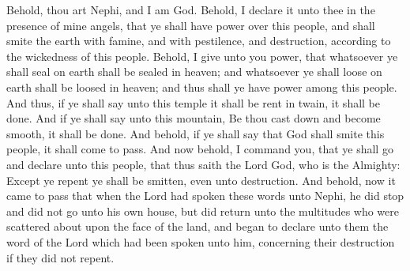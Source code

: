 \bverse \iffalse Behold, thou art Nephi, and I am God. Behold, I declare it unto thee in the presence of mine angels, that ye shall have power over this people, and shall smite the earth with famine, and with pestilence, and destruction, according to the wickedness of this people. \fi
Behold, thou art Nephi, and I am God. Behold, I declare it unto thee in the presence of mine angels, that ye shall have power over this people, and shall smite the earth with famine, and with pestilence, and destruction, according to the wickedness of this people.
\bverse \iffalse Behold, I give unto you power, that whatsoever ye shall seal on earth shall be sealed in heaven; and whatsoever ye shall loose on earth shall be loosed in heaven; and thus shall ye have power among this people. \fi
Behold, I give unto you power, that whatsoever ye shall seal on earth shall be sealed in heaven; and whatsoever ye shall loose on earth shall be loosed in heaven; and thus shall ye have power among this people.
\bverse \iffalse And thus, if ye shall say unto this temple it shall be rent in twain, it shall be done. \fi
And thus, if ye shall say unto this temple it shall be rent in twain, it shall be done.
\bverse \iffalse And if ye shall say unto this mountain, Be thou cast down and become smooth, it shall be done. \fi
And if ye shall say unto this mountain, Be thou cast down and become smooth, it shall be done.
\bverse \iffalse And behold, if ye shall say that God shall smite this people, it shall come to pass. \fi
And behold, if ye shall say that God shall smite this people, it shall come to pass.
\bverse \iffalse And now behold, I command you, that ye shall go and declare unto this people, that thus saith the Lord God, who is the Almighty: Except ye repent ye shall be smitten, even unto destruction. \fi
And now behold, I command you, that ye shall go and declare unto this people, that thus saith the Lord God, who is the Almighty: Except ye repent ye shall be smitten, even unto destruction.
\bverse \iffalse And behold, now it came to pass that when the Lord had spoken these words unto Nephi, he did stop and did not go unto his own house, but did return unto the multitudes who were scattered about upon the face of the land, and began to declare unto them the word of the Lord which had been spoken unto him, concerning their destruction if they did not repent. \fi
And behold, now it came to pass that when the Lord had spoken these words unto Nephi, he did stop and did not go unto his own house, but did return unto the multitudes who were scattered about upon the face of the land, and began to declare unto them the word of the Lord which had been spoken unto him, concerning their destruction if they did not repent.
